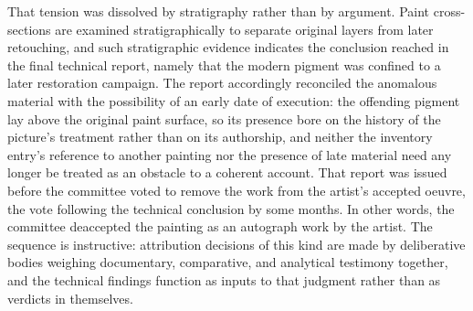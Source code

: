 \documentclass[11pt]{article}
\begin{document}
{That tension was dissolved by stratigraphy rather than by argument. Paint cross-sections are examined stratigraphically to separate original layers from later retouching, and such stratigraphic evidence indicates the conclusion reached in the final technical report, namely that the modern pigment was confined to a later restoration campaign. The report accordingly reconciled the anomalous material with the possibility of an early date of execution: the offending pigment lay above the original paint surface, so its presence bore on the history of the picture's treatment rather than on its authorship, and neither the inventory entry's reference to another painting nor the presence of late material need any longer be treated as an obstacle to a coherent account. That report was issued before the committee voted to remove the work from the artist's accepted oeuvre, the vote following the technical conclusion by some months. In other words, the committee deaccepted the painting as an autograph work by the artist. The sequence is instructive: attribution decisions of this kind are made by deliberative bodies weighing documentary, comparative, and analytical testimony together, and the technical findings function as inputs to that judgment rather than as verdicts in themselves.}
\end{document}
